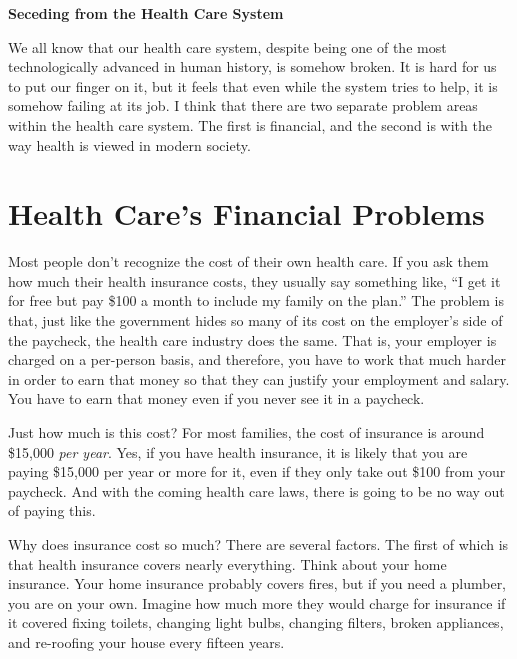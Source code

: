 \documentclass[letterpaper]{article}
\title{}
\begin{document}
\clearpage\setcounter{page}{1}\pagestyle{Standard}
{\centering{}\bfseries\color{black}
Seceding from the Health Care System
\par}

{\color{black}
We all know that our health care system, despite being one of the most
technologically advanced in human history, is somehow broken. It is
hard for us to put our finger on it, but it feels that even while
\textcolor[rgb]{0.32941177,0.5529412,0.83137256}{the system} tries to
help, it is somehow failing at its job. I think that there are two
separate problem areas within the health care system. The first is
financial, and the second is with the way health is viewed in modern
society.}

\section{Health Care’s Financial Problems}
{\color{black}
Most people don’t recognize the cost of their own health care. If you
ask them how much their health insurance costs, they usually say
something like, “I get it for free but pay \$100 a month to include my
family on the plan.”  The problem is that, just like the government
hides so many of its cost on the employer’s side of the paycheck, the
health care industry does the same. That is, your employer is charged
on a per-person basis, and therefore, you have to work that much harder
in order to earn that money
\textcolor[rgb]{0.32941177,0.5529412,0.83137256}{so that they can}
justify your employment and salary. You have to earn that money even if
you never see it in a paycheck.}

{\color{black}
Just how much is this cost?  For most families, the cost of insurance is
around \$15,000 \textit{per year}. Yes, if you have health insurance,
it is likely that you are paying \$15,000 per year or more for it, even
if they only take out \$100 from your paycheck. And with the coming
health care laws, there is going to be no way out of paying this.}

{\color{black}
Why does insurance cost so much?  There are several
factors.\textcolor[rgb]{0.32941177,0.5529412,0.83137256}{ The first of
which is that }health insurance covers nearly everything. Think about
your home insurance. Your home insurance probably covers fires, but if
you need a plumber, you are on your own. Imagine how much more they
would charge \textcolor[rgb]{0.32941177,0.5529412,0.83137256}{for}
insurance if it covered fixing toilets, changing light bulbs, changing
filters, broken appliances, and re-roofing your house every fifteen
years. }
\end{document}
